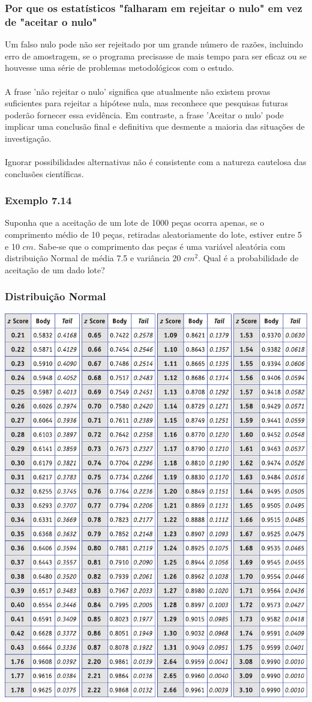 \documentclass[11pt]{beamer}
\begin{document}
\begin{frame}
\frametitle{Por que os estatísticos "falharam em rejeitar o nulo" em vez de "aceitar o nulo"}
Um falso nulo pode não ser rejeitado por um grande número de razões, incluindo erro de amostragem, se o programa precisasse de mais tempo para ser eficaz ou se houvesse uma série de problemas metodológicos com o estudo.\\~\\ 

A frase 'não rejeitar o nulo' significa que atualmente não existem provas suficientes para rejeitar a hipótese nula, mas reconhece que pesquisas futuras poderão fornecer essa evidência. Em contraste, a frase 'Aceitar o nulo' pode implicar uma conclusão final e definitiva que desmente a maioria das situações de investigação.\\~\\

Ignorar possibilidades alternativas não é consistente com a natureza cautelosa das conclusões científicas.

\end{frame}

\begin{frame}
\frametitle{Exemplo 7.14}
Suponha que a aceitação de um lote de 1000 peças ocorra apenas, se o comprimento médio de 10 peças, retiradas aleatoriamente do lote, estiver entre 5 e 10 \(cm\). Sabe-se que o comprimento das peças é uma variável aleatória com distribuição Normal de média 7.5 e variância 20 \(cm^2\). Qual é a probabilidade de aceitação de um dado lote?
\vspace{1in}
\vspace{1in}

\end{frame}

\begin{frame}
\frametitle{Distribuição Normal}

\begin{center}\includegraphics[width=0.5\linewidth]{figs/ztab_crop2} \end{center}
\end{frame}
\end{document}
